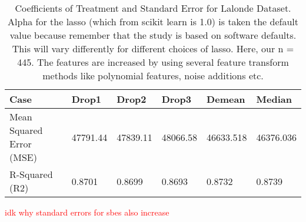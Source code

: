 \begin{table}[h!]
\renewcommand{\arraystretch}{1.5}
\centering
\begin{tabular}{||l l l l l l||} 
 \hline
 \hline
 Case & Drop1 & Drop2 & Drop3 & Demean & Median \\ [0.5ex] 
 \hline \hline
 Mean Squared Error (MSE) & 47791.44 & 47839.11 & 48066.58 & 46633.518 & 46376.036 \\ 
 R-Squared (R2) & 0.8701 & 0.8699 & 0.8693 & 0.8732 & 0.8739 \\
 \hline \hline
\end{tabular}
\caption{Coefficients of Treatment and Standard Error for Lalonde Dataset.  \\
Alpha for the lasso (which from scikit learn is 1.0) is taken the default value because remember that the study is based on software defaults. This will vary differently for different choices of lasso. Here, our n = 445. The features are increased by using several feature transform methods like polynomial features, noise additions etc.  }
\textcolor{red}{idk why standard errors for sbes also increase}
\label{table:1}
\end{table}



\begin{table}[h!]
\renewcommand{\arraystretch}{1.5}
\centering
\small
{}
\caption{Coefficients of Treatment and Standard Error for Lalonde Dataset.  \\
Alpha for the lasso (which from scikit learn is 1.0) is taken the default value because remember that the study is based on software defaults. This will vary differently for different choices of lasso. Here, our n = 445. The features are increased by using several feature transform methods like polynomial features, noise additions etc.  }
\label{table:1}
\end{table}




